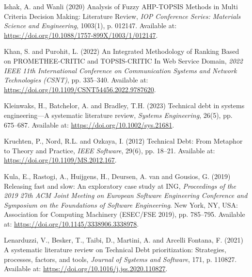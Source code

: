 \documentclass[
  british,
  12pt,
  a4paper,
]{report}
\newlength{\cslhangindent}
\newenvironment{CSLReferences}[2] %
 {\begin{list}{}{%
  \setlength{\itemindent}{0pt}
  \setlength{\leftmargin}{0pt}
  \setlength{\parsep}{0pt}
  \ifodd #1
   \setlength{\leftmargin}{\cslhangindent}
   \setlength{\itemindent}{-1\cslhangindent}
  \fi
  \setlength{\itemsep}{#2\baselineskip}}}
 {\end{list}}
\begin{document}
\begin{CSLReferences}{0}{1}
Ishak, A. and Wanli (2020) \textquotesingle Analysis of {Fuzzy
AHP-TOPSIS Methods} in {Multi Criteria Decision Making}: {Literature
Review}\textquotesingle, \emph{IOP Conference Series: Materials Science
and Engineering}, 1003(1), p. 012147. Available at:
\url{https://doi.org/10.1088/1757-899X/1003/1/012147}.

Khan, S. and Purohit, L. (2022) \textquotesingle An {Integrated
Methodology} of {Ranking Based} on {PROMETHEE-CRITIC} and {TOPSIS-CRITIC
In Web Service Domain}\textquotesingle, \emph{2022 {IEEE} 11th
{International Conference} on {Communication Systems} and {Network
Technologies} ({CSNT})}, pp. 335--340. Available at:
\url{https://doi.org/10.1109/CSNT54456.2022.9787620}.

Kleinwaks, H., Batchelor, A. and Bradley, T.H. (2023)
\textquotesingle Technical debt in systems engineering---{A} systematic
literature review\textquotesingle, \emph{Systems Engineering}, 26(5),
pp. 675--687. Available at: \url{https://doi.org/10.1002/sys.21681}.

Kruchten, P., Nord, R.L. and Ozkaya, I. (2012)
\textquotesingle Technical {Debt}: {From Metaphor} to {Theory} and
{Practice}\textquotesingle, \emph{IEEE Software}, 29(6), pp. 18--21.
Available at: \url{https://doi.org/10.1109/MS.2012.167}.

Kula, E., Rastogi, A., Huijgens, H., Deursen, A. van and Gousios, G.
(2019) \textquotesingle Releasing fast and slow: An exploratory case
study at {ING}\textquotesingle, \emph{Proceedings of the 2019 27th {ACM
Joint Meeting} on {European Software Engineering Conference} and
{Symposium} on the {Foundations} of {Software Engineering}}. New York,
NY, USA: Association for Computing Machinery ({ESEC}/{FSE} 2019), pp.
785--795. Available at: \url{https://doi.org/10.1145/3338906.3338978}.

Lenarduzzi, V., Besker, T., Taibi, D., Martini, A. and Arcelli Fontana,
F. (2021) \textquotesingle A systematic literature review on {Technical
Debt} prioritization: {Strategies}, processes, factors, and
tools\textquotesingle, \emph{Journal of Systems and Software}, 171, p.
110827. Available at: \url{https://doi.org/10.1016/j.jss.2020.110827}.


\end{CSLReferences}
\end{document}
